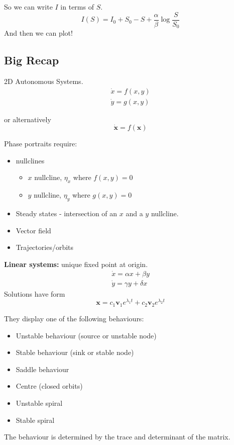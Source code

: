 \documentclass{X:/Documents/Coding/Latex/myassignment}
\begin{document}
So we can write $I$ in terms of $S$.
\[I(S) = I_0 + S_0 - S + \frac{\alpha}{\beta} \log \frac{S}{S_0}\]
And then we can plot!


\subsection{Big Recap}
2D Autonomous Systems.
\begin{align*}
    \dot{x} = f(x,y)\\
    \dot{y} = g(x,y)
\end{align*}

or alternatively
\[\dot{\mathbf{x}} = f(\mathbf{x})\]

Phase portraits require: 
\begin{itemize}
    \item nullclines 
    \begin{itemize}
         \item $x$ nullcline, $\eta_x$ where $f(x,y) = 0$
         \item $y$ nullcline, $\eta_y$ where $g(x,y) = 0$
     \end{itemize} 
     \item Steady states - intersection of an $x$ and a $y$ nullcline.
     \item Vector field
     \item Trajectories/orbits
\end{itemize}

\textbf{Linear systems:} unique fixed point at origin.
\begin{align*}
    \dot{x} = \alpha x + \beta y\\
    \dot{y} = \gamma y + \delta x
\end{align*}
Solutions have form
\[\mathbf{x} = c_1 \mathbf{v}_1 e^{\lambda_1 t} + c_2 \mathbf{v}_2 e^{\lambda_2 t}\]

They display one of the following behaviours:
\begin{itemize}
    \item Unstable behaviour (source or unstable node) 
    \item Stable behaviour (sink or stable node)
    \item Saddle behaviour
    \item Centre (closed orbits)
    \item Unstable spiral
    \item Stable spiral
\end{itemize}

The behaviour is determined by the trace and determinant of the matrix.
\end{document}

